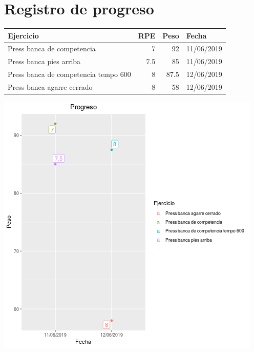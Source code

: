\documentclass[11pt]{article}
\begin{document}
\section{Registro de progreso}
\label{sec:orga337e63}
\begin{center}
\label{tab:org3185ff3}
\begin{tabular}{lrrl}
Ejercicio & RPE & Peso & Fecha\\
\hline
Press banca de competencia & 7 & 92 & 11/06/2019\\
Press banca pies arriba & 7.5 & 85 & 11/06/2019\\
Press banca de competencia tempo 600 & 8 & 87.5 & 12/06/2019\\
Press banca agarre cerrado & 8 & 58 & 12/06/2019\\
\end{tabular}
\end{center}
\begin{center}
\includegraphics[width=.9\linewidth]{tmp.png}
\end{center}
\end{document}
